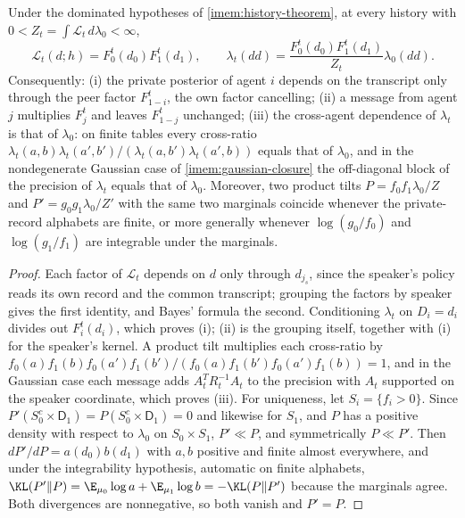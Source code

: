 Under the dominated hypotheses of \cref{imem:history-theorem}, at every history with $0<Z_t=\int\mathcal L_t\,d\lambda_0<\infty$,
\begin{equation}
 \mathcal L_t(d;h)=F_0^t(d_0)F_1^t(d_1),\qquad
 \lambda_t(dd)=\frac{F_0^t(d_0)F_1^t(d_1)}{Z_t}\lambda_0(dd).
 \label{imem:product-tilt-formula}
\end{equation}
Consequently: (i) the private posterior of agent $i$ depends on the transcript only through the peer factor $F_{1-i}^t$, the own factor cancelling; (ii) a message from agent $j$ multiplies $F_j^t$ and leaves $F_{1-j}^t$ unchanged; (iii) the cross-agent dependence of $\lambda_t$ is that of $\lambda_0$: on finite tables every cross-ratio $\lambda_t(a,b)\lambda_t(a',b')/(\lambda_t(a,b')\lambda_t(a',b))$ equals that of $\lambda_0$, and in the nondegenerate Gaussian case of \cref{imem:gaussian-closure} the off-diagonal block of the precision of $\lambda_t$ equals that of $\lambda_0$. Moreover, two product tilts $P=f_0f_1\lambda_0/Z$ and $P'=g_0g_1\lambda_0/Z'$ with the same two marginals coincide whenever the private-record alphabets are finite, or more generally whenever $\log(g_0/f_0)$ and $\log(g_1/f_1)$ are integrable under the marginals.
\begin{proof}
Each factor of $\mathcal L_t$ depends on $d$ only through $d_{j_s}$, since the speaker's policy reads its own record and the common transcript; grouping the factors by speaker gives the first identity, and Bayes' formula the second. Conditioning $\lambda_t$ on $D_i=d_i$ divides out $F_i^t(d_i)$, which proves (i); (ii) is the grouping itself, together with (i) for the speaker's kernel. A product tilt multiplies each cross-ratio by $f_0(a)f_1(b)f_0(a')f_1(b')/(f_0(a)f_1(b')f_0(a')f_1(b))=1$, and in the Gaussian case each message adds $A_t^TR_t^{-1}A_t$ to the precision with $A_t$ supported on the speaker coordinate, which proves (iii). For uniqueness, let $S_i=\{f_i>0\}$. Since $P'(S_0^c\times\mathsf D_1)=P(S_0^c\times\mathsf D_1)=0$ and likewise for $S_1$, and $P$ has a positive density with respect to $\lambda_0$ on $S_0\times S_1$, $P'\ll P$, and symmetrically $P\ll P'$. Then $dP'/dP=a(d_0)b(d_1)$ with $a,b$ positive and finite almost everywhere, and under the integrability hypothesis, automatic on finite alphabets, $\KL(P'\Vert P)=\E_{\mu_0}\log a+\E_{\mu_1}\log b=-\KL(P\Vert P')$ because the marginals agree. Both divergences are nonnegative, so both vanish and $P'=P$.
\end{proof}


